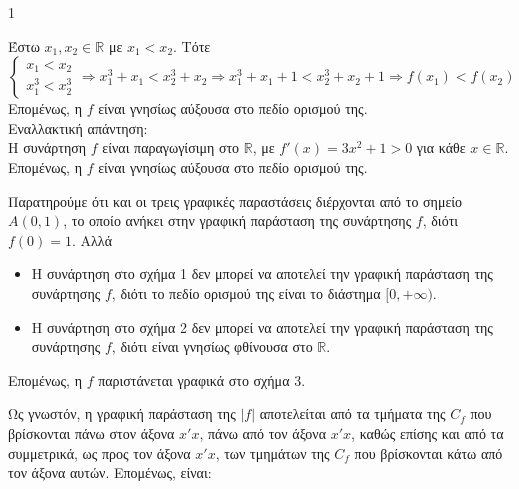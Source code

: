\begin{ylh}{1}
    \item [Ύλη από εικόνα]
\end{ylh}

\begin{alist}
\item [\textalpha)] Έστω $x_1, x_2 \in \mathbb{R}$ με $x_1 < x_2$. Τότε
\[ \left\{ \begin{array}{l} x_1 < x_2 \\ x_1^3 < x_2^3 \end{array} \right. \Rightarrow x_1^3 + x_1 < x_2^3 + x_2 \Rightarrow x_1^3 + x_1 + 1 < x_2^3 + x_2 + 1 \Rightarrow f(x_1) < f(x_2) \]
Επομένως, η $f$ είναι γνησίως αύξουσα στο πεδίο ορισμού της.\\
Εναλλακτική απάντηση:\\
Η συνάρτηση $f$ είναι παραγωγίσιμη στο $\mathbb{R}$, με $f'(x) = 3x^2 + 1 > 0$ για κάθε $x \in \mathbb{R}$. Επομένως, η $f$ είναι γνησίως αύξουσα στο πεδίο ορισμού της. 
\item [\textbeta)] Παρατηρούμε ότι και οι τρεις γραφικές παραστάσεις διέρχονται από το σημείο $A(0,1)$, το οποίο ανήκει στην γραφική παράσταση της συνάρτησης $f$, διότι $f(0) = 1$. Αλλά
\begin{itemize}
    \item Η συνάρτηση στο σχήμα 1 δεν μπορεί να αποτελεί την γραφική παράσταση της συνάρτησης $f$, διότι το πεδίο ορισμού της είναι το διάστημα $[0, +\infty)$.
    \item Η συνάρτηση στο σχήμα 2 δεν μπορεί να αποτελεί την γραφική παράσταση της συνάρτησης $f$, διότι είναι γνησίως φθίνουσα στο $\mathbb{R}$.
\end{itemize}
Επομένως, η $f$ παριστάνεται γραφικά στο σχήμα 3. 

\item [\textgamma)]
\begin{rlist}
\item Ως γνωστόν, η γραφική παράσταση της $|f|$ αποτελείται από τα τμήματα της $C_f$ που βρίσκονται πάνω στον άξονα $x'x$, πάνω από τον άξονα $x'x$, καθώς επίσης και από τα συμμετρικά, ως προς τον άξονα $x'x$, των τμημάτων της $C_f$ που βρίσκονται κάτω από τον άξονα αυτών. Επομένως, είναι:

\begin{figure}
\centering
{}
\end{figure}
\end{rlist}
\end{alist}
